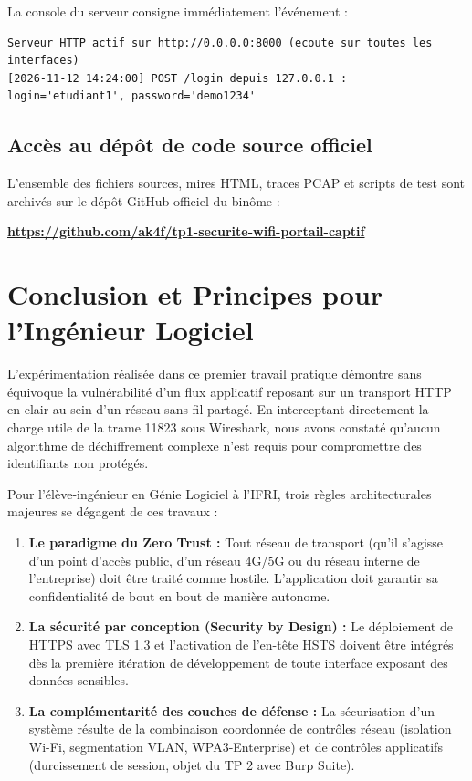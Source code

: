 \documentclass[a4paper,11pt]{article}
\begin{document}
La console du serveur consigne immédiatement l'événement :
\begin{lstlisting}
Serveur HTTP actif sur http://0.0.0.0:8000 (ecoute sur toutes les interfaces)
[2026-11-12 14:24:00] POST /login depuis 127.0.0.1 : login='etudiant1', password='demo1234'
\end{lstlisting}

\subsection{Accès au dépôt de code source officiel}
L'ensemble des fichiers sources, mires HTML, traces PCAP et scripts de test sont archivés sur le dépôt GitHub officiel du binôme :
\begin{center}
\textbf{\url{https://github.com/ak4f/tp1-securite-wifi-portail-captif}}
\end{center}

\section{Conclusion et Principes pour l'Ingénieur Logiciel}

L'expérimentation réalisée dans ce premier travail pratique démontre sans équivoque la vulnérabilité d'un flux applicatif reposant sur un transport HTTP en clair au sein d'un réseau sans fil partagé. En interceptant directement la charge utile de la trame 11823 sous Wireshark, nous avons constaté qu'aucun algorithme de déchiffrement complexe n'est requis pour compromettre des identifiants non protégés.

Pour l'élève-ingénieur en Génie Logiciel à l'IFRI, trois règles architecturales majeures se dégagent de ces travaux :
\begin{enumerate}
  \item \textbf{Le paradigme du Zero Trust :} Tout réseau de transport (qu'il s'agisse d'un point d'accès public, d'un réseau 4G/5G ou du réseau interne de l'entreprise) doit être traité comme hostile. L'application doit garantir sa confidentialité de bout en bout de manière autonome.
  \item \textbf{La sécurité par conception (Security by Design) :} Le déploiement de HTTPS avec TLS 1.3 et l'activation de l'en-tête HSTS doivent être intégrés dès la première itération de développement de toute interface exposant des données sensibles.
  \item \textbf{La complémentarité des couches de défense :} La sécurisation d'un système résulte de la combinaison coordonnée de contrôles réseau (isolation Wi-Fi, segmentation VLAN, WPA3-Enterprise) et de contrôles applicatifs (durcissement de session, objet du TP 2 avec Burp Suite).
\end{enumerate}
\end{document}
